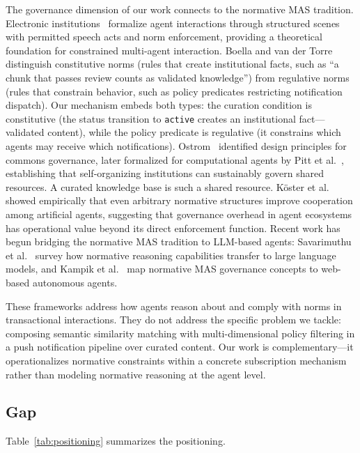 \documentclass[11pt]{article}
\begin{document}
The governance dimension of our work connects to the normative MAS tradition. Electronic institutions~\cite{esteva2002} formalize agent interactions through structured scenes with permitted speech acts and norm enforcement, providing a theoretical foundation for constrained multi-agent interaction. Boella and van der Torre~\cite{boella2004} distinguish constitutive norms (rules that create institutional facts, such as ``a chunk that passes review counts as validated knowledge'') from regulative norms (rules that constrain behavior, such as policy predicates restricting notification dispatch). Our mechanism embeds both types: the curation condition is constitutive (the status transition to \texttt{active} creates an institutional fact---validated content), while the policy predicate is regulative (it constrains which agents may receive which notifications). Ostrom~\cite{ostrom1990} identified design principles for commons governance, later formalized for computational agents by Pitt et al.~\cite{pitt2012}, establishing that self-organizing institutions can sustainably govern shared resources. A curated knowledge base is such a shared resource. K\"{o}ster et al.~\cite{koster2022} showed empirically that even arbitrary normative structures improve cooperation among artificial agents, suggesting that governance overhead in agent ecosystems has operational value beyond its direct enforcement function. Recent work has begun bridging the normative MAS tradition to LLM-based agents: Savarimuthu et al.~\cite{savarimuthu2025} survey how normative reasoning capabilities transfer to large language models, and Kampik et al.~\cite{kampik2022} map normative MAS governance concepts to web-based autonomous agents.

These frameworks address how agents reason about and comply with norms in transactional interactions. They do not address the specific problem we tackle: composing semantic similarity matching with multi-dimensional policy filtering in a push notification pipeline over curated content. Our work is complementary---it operationalizes normative constraints within a concrete subscription mechanism rather than modeling normative reasoning at the agent level.

\subsection{Gap}

Table~\ref{tab:positioning} summarizes the positioning.
\end{document}
